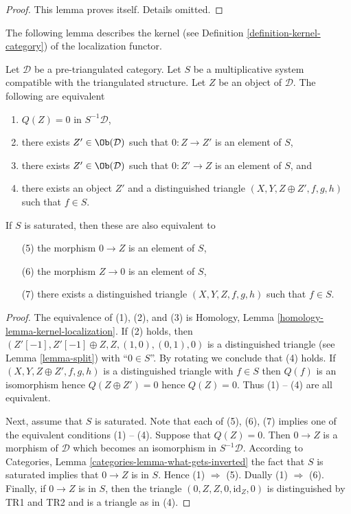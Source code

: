 \begin{proof}
This lemma proves itself. Details omitted.
\end{proof}

\noindent
The following lemma describes the kernel (see
Definition \ref{definition-kernel-category})
of the localization functor.

\begin{lemma}
\label{lemma-kernel-localization}
Let $\mathcal{D}$ be a pre-triangulated category. Let $S$ be a multiplicative
system compatible with the triangulated structure. Let $Z$ be an object
of $\mathcal{D}$. The following are equivalent
\begin{enumerate}
\item $Q(Z) = 0$ in $S^{-1}\mathcal{D}$,
\item there exists $Z' \in \Ob(\mathcal{D})$ such that
$0 : Z \to Z'$ is an element of $S$,
\item there exists $Z' \in \Ob(\mathcal{D})$ such that
$0 : Z' \to Z$ is an element of $S$, and
\item there exists an object $Z'$ and a distinguished triangle
$(X, Y, Z \oplus Z', f, g, h)$ such that $f \in S$.
\end{enumerate}
If $S$ is saturated, then these are also equivalent to
\begin{enumerate}
\item[(5)] the morphism $0 \to Z$ is an element of $S$,
\item[(6)] the morphism $Z \to 0$ is an element of $S$,
\item[(7)] there exists a distinguished triangle $(X, Y, Z, f, g, h)$
such that $f \in S$.
\end{enumerate}
\end{lemma}

\begin{proof}
The equivalence of (1), (2), and (3) is
Homology, Lemma \ref{homology-lemma-kernel-localization}.
If (2) holds, then $(Z'[-1], Z'[-1] \oplus Z, Z, (1, 0), (0, 1), 0)$
is a distinguished triangle (see
Lemma \ref{lemma-split})
with ``$0 \in S$''. By rotating we conclude that (4) holds.
If $(X, Y, Z \oplus Z', f, g, h)$ is a distinguished triangle with $f \in S$
then $Q(f)$ is an isomorphism hence $Q(Z \oplus Z') = 0$ hence $Q(Z) = 0$.
Thus (1) -- (4) are all equivalent.

\medskip\noindent
Next, assume that $S$ is saturated. Note that each of (5), (6), (7)
implies one of the equivalent conditions (1) -- (4). Suppose that
$Q(Z) = 0$. Then $0 \to Z$ is a morphism of $\mathcal{D}$ which becomes
an isomorphism in $S^{-1}\mathcal{D}$. According to
Categories, Lemma \ref{categories-lemma-what-gets-inverted}
the fact that $S$ is saturated implies that $0 \to Z$ is in $S$.
Hence (1) $\Rightarrow$ (5). Dually (1) $\Rightarrow$ (6).
Finally, if $0 \to Z$ is in $S$, then the triangle
$(0, Z, Z, 0, \text{id}_Z, 0)$ is distinguished by TR1 and TR2 and
is a triangle as in (4).
\end{proof}

